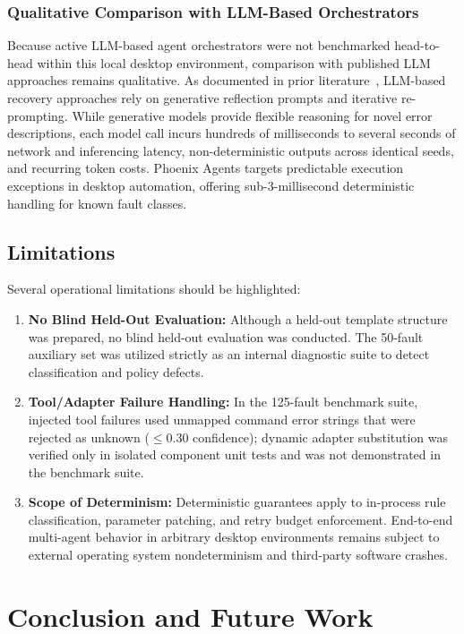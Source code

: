 \documentclass[conference]{IEEEtran}
\newcommand{\chg}[1]{{\color{blue}#1}}
\begin{document}
\subsubsection{\chg{Qualitative Comparison with LLM-Based Orchestrators}}
\chg{Because active LLM-based agent orchestrators were not benchmarked head-to-head within this local desktop environment, comparison with published LLM approaches remains qualitative. As documented in prior literature~\cite{babu2026,wu2025}, LLM-based recovery approaches rely on generative reflection prompts and iterative re-prompting. While generative models provide flexible reasoning for novel error descriptions, each model call incurs hundreds of milliseconds to several seconds of network and inferencing latency, non-deterministic outputs across identical seeds, and recurring token costs. Phoenix Agents targets predictable execution exceptions in desktop automation, offering sub-3-millisecond deterministic handling for known fault classes.}

\subsection{\chg{Limitations}}
\chg{Several operational limitations should be highlighted:}
\begin{enumerate}
    \item \chg{\textbf{No Blind Held-Out Evaluation:} Although a held-out template structure was prepared, no blind held-out evaluation was conducted. The 50-fault auxiliary set was utilized strictly as an internal diagnostic suite to detect classification and policy defects.}
    \item \chg{\textbf{Tool/Adapter Failure Handling:} In the 125-fault benchmark suite, injected tool failures used unmapped command error strings that were rejected as unknown ($\le 0.30$ confidence); dynamic adapter substitution was verified only in isolated component unit tests and was not demonstrated in the benchmark suite.}
    \item \chg{\textbf{Scope of Determinism:} Deterministic guarantees apply to in-process rule classification, parameter patching, and retry budget enforcement. End-to-end multi-agent behavior in arbitrary desktop environments remains subject to external operating system nondeterminism and third-party software crashes.}
\end{enumerate}

\section{Conclusion and Future Work}
\end{document}
